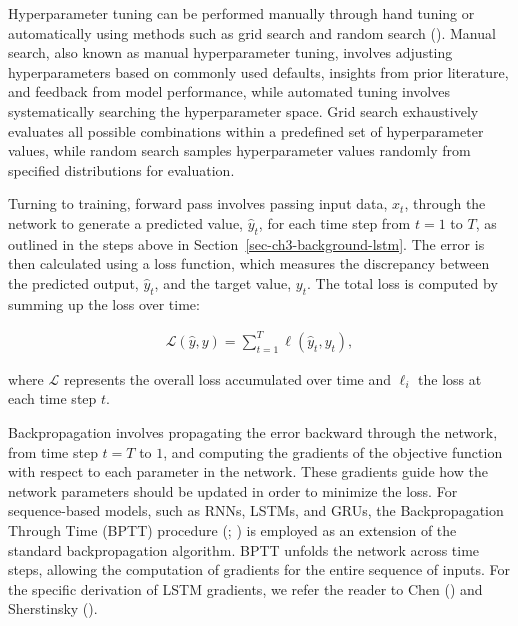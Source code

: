 \documentclass[
  letterpaper,
  double,
  12pt,
  1.0in]{beavtex}
\begin{document}
Hyperparameter tuning can be performed manually through hand tuning or
automatically using methods such as grid search and random search
(). Manual
search, also known as manual hyperparameter tuning, involves adjusting
hyperparameters based on commonly used defaults, insights from prior
literature, and feedback from model performance, while automated tuning
involves systematically searching the hyperparameter space. Grid search
exhaustively evaluates all possible combinations within a predefined set
of hyperparameter values, while random search samples hyperparameter
values randomly from specified distributions for evaluation.

Turning to training, forward pass involves passing input data, \(x_t\),
through the network to generate a predicted value, \(\hat{y}_{t}\), for
each time step from \(t =1\) to \(T\), as outlined in the steps above in
Section~\ref{sec-ch3-background-lstm}. The error is then calculated
using a loss function, which measures the discrepancy between the
predicted output, \(\hat{y}_t\), and the target value, \(y_t\). The
total loss is computed by summing up the loss over time:

\begin{equation}
\begin{split}
\mathcal{L}(\hat{y}, y) = \sum_{t=1}^T \ell(\hat{y}_t, y_t),
\end{split}
\end{equation}

where \(\mathcal{L}\) represents the overall loss accumulated over time
and \(\ell_i\) the loss at each time step \(t\).

Backpropagation involves propagating the error backward through the
network, from time step \(t = T\) to \(1\), and computing the gradients
of the objective function with respect to each parameter in the network.
These gradients guide how the network parameters should be updated in
order to minimize the loss. For sequence-based models, such as RNNs,
LSTMs, and GRUs, the Backpropagation Through Time (BPTT) procedure
(;
) is employed as an
extension of the standard backpropagation algorithm. BPTT unfolds the
network across time steps, allowing the computation of gradients for the
entire sequence of inputs. For the specific derivation of LSTM
gradients, we refer the reader to Chen
() and Sherstinsky
().
\end{document}
